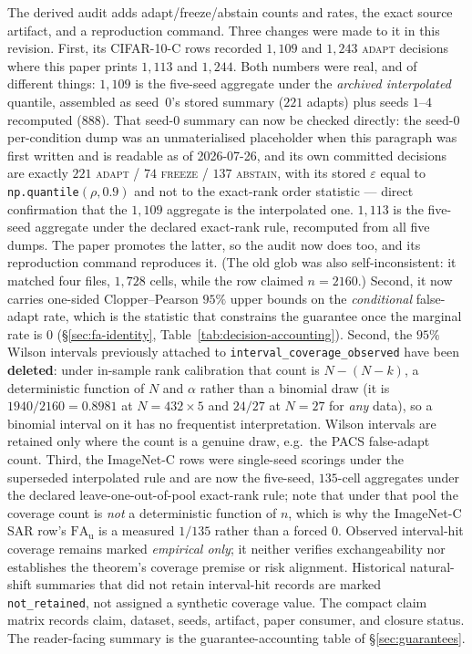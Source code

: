 The derived audit 
adds adapt/freeze/abstain counts and rates, the exact source artifact, and a reproduction command.
Three changes were made to it in this revision. First, its CIFAR-10-C rows recorded $1{,}109$ and
$1{,}243$ \textsc{adapt} decisions where this paper prints $1{,}113$ and $1{,}244$. Both numbers
were real, and of different things: $1{,}109$ is the  five-seed
aggregate under the \emph{archived interpolated} quantile, assembled as seed~$0$'s stored summary
($221$ adapts) plus seeds $1$--$4$ recomputed ($888$). That seed-$0$ summary can now be checked
directly: the seed-$0$ per-condition dump was an unmaterialised placeholder when this paragraph was
first written and is readable as of 2026-07-26, and its own committed decisions are exactly
$221$ \textsc{adapt} / $74$ \textsc{freeze} / $137$ \textsc{abstain}, with its stored
$\varepsilon$ equal to \texttt{np.quantile}$(\rho,0.9)$ and not to the exact-rank order statistic
--- direct confirmation that the $1{,}109$ aggregate is the interpolated one.
$1{,}113$ is the  five-seed aggregate under the declared
exact-rank rule, recomputed from all five dumps. The paper promotes the latter, so the audit now
does too, and its reproduction command reproduces it. (The old glob was also self-inconsistent: it
matched four files, $1{,}728$ cells, while the row claimed $n=2160$.) Second, it now carries
one-sided Clopper--Pearson
$95\%$ upper bounds on the \emph{conditional} false-adapt rate, which is the statistic that
constrains the guarantee once the marginal rate is $0$ (\S\ref{sec:fa-identity},
Table~\ref{tab:decision-accounting}). Second, the $95\%$ Wilson intervals previously attached to
\texttt{interval\_coverage\_observed} have been \textbf{deleted}: under in-sample rank calibration
that count is $N-(N-k)$, a deterministic function of $N$ and $\alpha$ rather than a binomial draw
(it is $1940/2160=0.8981$ at $N{=}432\times5$ and $24/27$ at $N{=}27$ for \emph{any} data), so a
binomial interval on it has no frequentist interpretation. Wilson intervals are retained only where
the count is a genuine draw, e.g.\ the PACS false-adapt count. Third, the ImageNet-C rows were
single-seed scorings under the superseded interpolated rule and are now the five-seed,
$135$-cell aggregates under the declared leave-one-out-of-pool exact-rank rule; note that under
that pool the coverage count is \emph{not} a deterministic function of $n$, which is why the
ImageNet-C SAR row's $\mathrm{FA}_{\mathrm u}$ is a measured $1/135$ rather than a forced $0$. Observed interval-hit coverage
remains marked \emph{empirical only}; it neither verifies exchangeability nor establishes the
theorem's coverage premise or risk alignment. Historical natural-shift summaries that did not retain interval-hit
records are marked \texttt{not\_retained}, not assigned a synthetic coverage value. The compact
claim matrix  records claim, dataset,
seeds, artifact, paper consumer, and closure status. The reader-facing summary is the
guarantee-accounting table of \S\ref{sec:guarantees}.

